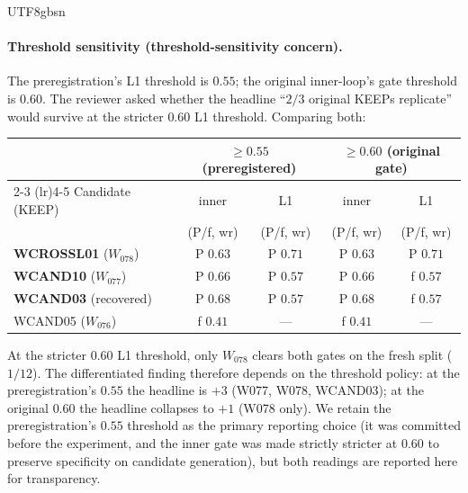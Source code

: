 \documentclass{article}
\begin{document}
\begin{CJK*}{UTF8}{gbsn}
\paragraph{Threshold sensitivity (threshold-sensitivity concern).} The
preregistration's L1 threshold is \(0.55\); the original
inner-loop's gate threshold is \(0.60\). The reviewer asked
whether the headline ``\(2/3\) original KEEPs replicate'' would
survive at the stricter \(0.60\) L1 threshold. Comparing both:

\begin{center}\small
\begin{tabular}{l c c c c}
  \toprule
  & \multicolumn{2}{c}{\(\geq 0.55\) (preregistered)} & \multicolumn{2}{c}{\(\geq 0.60\) (original gate)} \\
  \cmidrule(lr){2-3} \cmidrule(lr){4-5}
  Candidate (KEEP) & inner & L1 & inner & L1 \\
  & (P/f, wr) & (P/f, wr) & (P/f, wr) & (P/f, wr) \\
  \midrule
  \textbf{WCROSSL01} (\(W_{078}\)) & P \(0.63\) & P \(0.71\) & P \(0.63\) & P \(0.71\) \\
  \textbf{WCAND10} (\(W_{077}\))   & P \(0.66\) & P \(0.57\) & P \(0.66\) & f \(0.57\) \\
  \textbf{WCAND03} (recovered)     & P \(0.68\) & P \(0.57\) & P \(0.68\) & f \(0.57\) \\
  WCAND05 (\(W_{076}\))            & f \(0.41\) & ---       & f \(0.41\) & --- \\
  \bottomrule
\end{tabular}
\end{center}

At the stricter \(0.60\) L1 threshold, only \(W_{078}\) clears
both gates on the fresh split (\(1/12\)). The differentiated
finding therefore depends on the threshold policy: at the
preregistration's \(0.55\) the headline is \(\boxed{+3}\)
(W077, W078, WCAND03); at the original \(0.60\) the headline
collapses to \(\boxed{+1}\) (W078 only). We retain the
preregistration's \(0.55\) threshold as the primary reporting
choice (it was committed before the experiment, and the inner
gate was made strictly stricter at \(0.60\) to preserve
specificity on candidate generation), but both readings are
reported here for transparency.


\end{CJK*}
\end{document}

